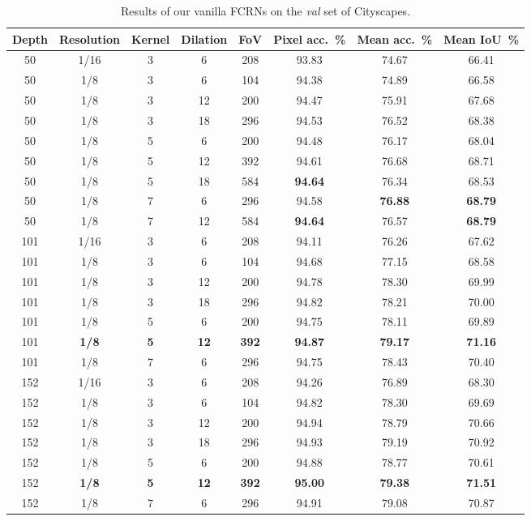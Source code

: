 \documentclass{article}
\begin{document}
\begin{table}[t]
\caption{Results of our vanilla FCRNs on the \emph{val} set of Cityscapes.}
\label{tbl:fcrn cityscapes val}
\centering
\small
\begin{tabular}{ccccc|ccc}
\toprule
Depth & Resolution & Kernel & Dilation & FoV & Pixel acc.~\% & Mean acc.~\% & Mean IoU~\% \\
\hline\hline
50 & 1/16 & 3 & 6 & 208 & 93.83 & 74.67 & 66.41 \\
50 & 1/8 & 3 & 6 & 104 & 94.38 & 74.89 & 66.58 \\
50 & 1/8 & 3 & 12 & 200 & 94.47 & 75.91 & 67.68 \\
50 & 1/8 & 3 & 18 & 296 & 94.53 & 76.52 & 68.38 \\
50 & 1/8 & 5 & 6 & 200 & 94.48 & 76.17 & 68.04 \\
50 & 1/8 & 5 & 12 & 392 & 94.61 & 76.68 & 68.71 \\
50 & 1/8 & 5 & 18 & 584 & \textbf{94.64} & 76.34 & 68.53 \\
50 & 1/8 & 7 & 6 & 296 & 94.58 & \textbf{76.88} & \textbf{68.79} \\
50 & 1/8 & 7 & 12 & 584 & \textbf{94.64} & 76.57 & \textbf{68.79} \\
\hline\hline
101 & 1/16 & 3 & 6 & 208 & 94.11 & 76.26 & 67.62 \\
101 & 1/8 & 3 & 6 & 104 & 94.68 & 77.15 & 68.58 \\
101 & 1/8 & 3 & 12 & 200 & 94.78 & 78.30 & 69.99 \\
101 & 1/8 & 3 & 18 & 296 & 94.82 & 78.21 & 70.00 \\
101 & 1/8 & 5 & 6 & 200 & 94.75 & 78.11 & 69.89 \\
101 & \textbf{1/8} & \textbf{5} & \textbf{12} & \textbf{392} & \textbf{94.87} & \textbf{79.17} & \textbf{71.16} \\
101 & 1/8 & 7 & 6 & 296 & 94.75 & 78.43 & 70.40 \\
\hline\hline
152 & 1/16 & 3 & 6 & 208 & 94.26 & 76.89 & 68.30 \\
152 & 1/8 & 3 & 6 & 104 & 94.82 & 78.30 & 69.69 \\
152 & 1/8 & 3 & 12 & 200 & 94.94 & 78.79 & 70.66 \\
152 & 1/8 & 3 & 18 & 296 & 94.93 & 79.19 & 70.92 \\
152 & 1/8 & 5 & 6 & 200 & 94.88 & 78.77 & 70.61 \\
152 & \textbf{1/8} & \textbf{5} & \textbf{12} & \textbf{392} & \textbf{95.00} & \textbf{79.38} & \textbf{71.51} \\
152 & 1/8 & 7 & 6 & 296 & 94.91 & 79.08 & 70.87 \\
\bottomrule
\end{tabular}
\end{table}
\end{document}
